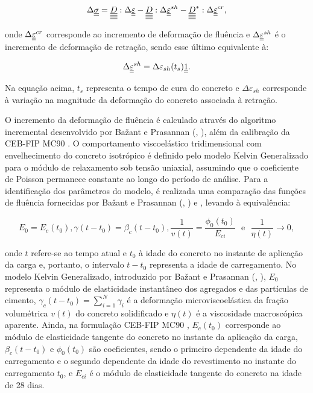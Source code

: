 \begin{equation}
\Delta \underline{\underline \sigma} = \underline{\underline{\underline{\underline D}}} : \Delta \underline{\underline \varepsilon} - \underline{\underline{\underline{\underline D}}} : \Delta \underline{\underline \varepsilon}^{sh} - \underline{\underline{\underline{\underline D}}}^{\ast} : \Delta \underline{\underline \varepsilon}^{cr},
\end{equation}

onde $\Delta \underline{\underline \varepsilon}^{cr}$ corresponde ao incremento de deformação de fluência e $\Delta \underline{\underline \varepsilon}^{sh}$ é o incremento de deformação de retração, sendo esse último equivalente à:

\begin{equation}
\Delta \underline{\underline \varepsilon}^{sh} = \Delta \varepsilon_{sh}(t_s)\underline{\underline 1}.
\end{equation}

Na equação acima, $t_s$ representa o tempo de cura do concreto e $\Delta \varepsilon_{sh}$ corresponde à variação na magnitude da deformação do concreto associada à retração.

O incremento da deformação de fluência é calculado através do algoritmo incremental desenvolvido por Ba\v{z}ant e Prasannan (\citeyear{BazantPrasannanA}, \citeyear{BazantPrasannanB}), além da calibração da CEB-FIP MC90 \cite{CEB1993}. O comportamento viscoelástico tridimensional com envelhecimento do concreto isotrópico é definido pelo modelo Kelvin Generalizado para o módulo de relaxamento sob tensão uniaxial, assumindo que o coeficiente de Poisson permanece constante ao longo do período de análise. Para a identificação dos parâmetros do modelo, é realizada uma comparação das funções de fluência fornecidas por Ba\v{z}ant e Prasannan (\citeyear{BazantPrasannanA}, \citeyear{BazantPrasannanB}) e , levando à equivalência:

\begin{equation}
E_0 = E_c(t_0), \gamma(t-t_0) = \beta_c (t-t_0), \dfrac{1}{v(t)} = \dfrac{\phi_0(t_0)}{E_{ci}} ~~~ \text{e} ~~~ \dfrac{1}{\eta(t)} \rightarrow 0,
\end{equation}

onde $t$ refere-se ao tempo atual e $t_0$ à idade do concreto no instante de aplicação da carga e, portanto, o intervalo $t-t_0$ representa a idade de carregamento. No modelo Kelvin Generalizado, introduzido por Ba\v{z}ant e Prasannan (\citeyear{BazantPrasannanA}, \citeyear{BazantPrasannanB}), $E_0$ representa o módulo de elasticidade instantâneo dos agregados e das partículas de cimento, $\gamma_c(t-t_0) = \sum\limits_{i=1}^{N}\gamma_i$ é a deformação microviscoelástica da fração volumétrica $v(t)$ do concreto solidificado e $\eta(t)$ é a viscosidade macroscópica aparente. Ainda, na formulação CEB-FIP MC90 \cite{CEB1993}, $E_c(t_0)$ corresponde ao módulo de elasticidade tangente do concreto no instante da aplicação da carga, $\beta_c(t-t_0)$ e $\phi_0(t_0)$ são coeficientes, sendo o primeiro dependente da idade do carregamento e o segundo dependente da idade do revestimento no instante do carregamento $t_0$, e $E_{ci}$ é o módulo de elasticidade tangente do concreto na idade de 28 dias. 

